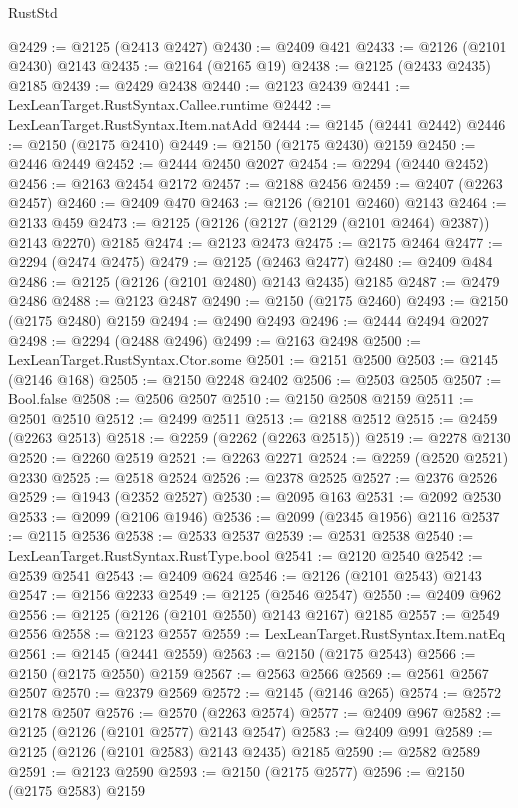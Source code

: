 \begin{lexlean}{RustStd}
\begin{coremodule}
@2429 := @2125 (@2413 @2427)
@2430 := @2409 @421
@2433 := @2126 (@2101 @2430) @2143
@2435 := @2164 (@2165 @19)
@2438 := @2125 (@2433 @2435) @2185
@2439 := @2429 @2438
@2440 := @2123 @2439
@2441 := LexLeanTarget.RustSyntax.Callee.runtime
@2442 := LexLeanTarget.RustSyntax.Item.natAdd
@2444 := @2145 (@2441 @2442)
@2446 := @2150 (@2175 @2410)
@2449 := @2150 (@2175 @2430) @2159
@2450 := @2446 @2449
@2452 := @2444 @2450 @2027
@2454 := @2294 (@2440 @2452)
@2456 := @2163 @2454 @2172
@2457 := @2188 @2456
@2459 := @2407 (@2263 @2457)
@2460 := @2409 @470
@2463 := @2126 (@2101 @2460) @2143
@2464 := @2133 @459
@2473 := @2125 (@2126 (@2127 (@2129 (@2101 @2464) @2387)) @2143 @2270) @2185
@2474 := @2123 @2473
@2475 := @2175 @2464
@2477 := @2294 (@2474 @2475)
@2479 := @2125 (@2463 @2477)
@2480 := @2409 @484
@2486 := @2125 (@2126 (@2101 @2480) @2143 @2435) @2185
@2487 := @2479 @2486
@2488 := @2123 @2487
@2490 := @2150 (@2175 @2460)
@2493 := @2150 (@2175 @2480) @2159
@2494 := @2490 @2493
@2496 := @2444 @2494 @2027
@2498 := @2294 (@2488 @2496)
@2499 := @2163 @2498
@2500 := LexLeanTarget.RustSyntax.Ctor.some
@2501 := @2151 @2500
@2503 := @2145 (@2146 @168)
@2505 := @2150 @2248 @2402
@2506 := @2503 @2505
@2507 := Bool.false
@2508 := @2506 @2507
@2510 := @2150 @2508 @2159
@2511 := @2501 @2510
@2512 := @2499 @2511
@2513 := @2188 @2512
@2515 := @2459 (@2263 @2513)
@2518 := @2259 (@2262 (@2263 @2515))
@2519 := @2278 @2130
@2520 := @2260 @2519
@2521 := @2263 @2271
@2524 := @2259 (@2520 @2521) @2330
@2525 := @2518 @2524
@2526 := @2378 @2525
@2527 := @2376 @2526
@2529 := @1943 (@2352 @2527)
@2530 := @2095 @163
@2531 := @2092 @2530
@2533 := @2099 (@2106 @1946)
@2536 := @2099 (@2345 @1956) @2116
@2537 := @2115 @2536
@2538 := @2533 @2537
@2539 := @2531 @2538
@2540 := LexLeanTarget.RustSyntax.RustType.bool
@2541 := @2120 @2540
@2542 := @2539 @2541
@2543 := @2409 @624
@2546 := @2126 (@2101 @2543) @2143
@2547 := @2156 @2233
@2549 := @2125 (@2546 @2547)
@2550 := @2409 @962
@2556 := @2125 (@2126 (@2101 @2550) @2143 @2167) @2185
@2557 := @2549 @2556
@2558 := @2123 @2557
@2559 := LexLeanTarget.RustSyntax.Item.natEq
@2561 := @2145 (@2441 @2559)
@2563 := @2150 (@2175 @2543)
@2566 := @2150 (@2175 @2550) @2159
@2567 := @2563 @2566
@2569 := @2561 @2567 @2507
@2570 := @2379 @2569
@2572 := @2145 (@2146 @265)
@2574 := @2572 @2178 @2507
@2576 := @2570 (@2263 @2574)
@2577 := @2409 @967
@2582 := @2125 (@2126 (@2101 @2577) @2143 @2547)
@2583 := @2409 @991
@2589 := @2125 (@2126 (@2101 @2583) @2143 @2435) @2185
@2590 := @2582 @2589
@2591 := @2123 @2590
@2593 := @2150 (@2175 @2577)
@2596 := @2150 (@2175 @2583) @2159

\end{coremodule}
\end{lexlean}
